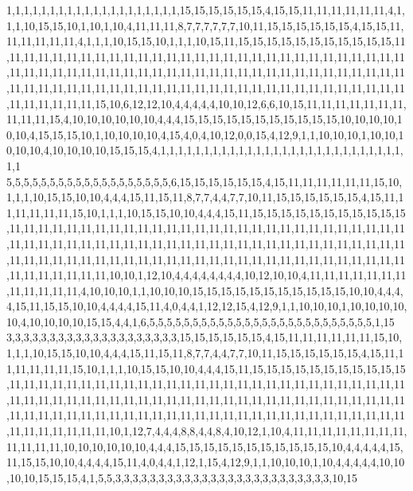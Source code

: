 1,1,1,1,1,1,1,1,1,1,1,1,1,1,1,1,1,1,1,1,15,15,15,15,15,15,4,15,15,11,11,11,11,11,11,4,1,1,1,10,15,15,10,1,10,1,10,4,11,11,11,8,7,7,7,7,7,7,10,11,15,15,15,15,15,15,4,15,15,11,11,11,11,11,11,4,1,1,1,10,15,15,10,1,1,1,10,15,11,15,15,15,15,15,15,15,15,15,15,15,11,11,11,11,11,11,11,11,11,11,11,11,11,11,11,11,11,11,11,11,11,11,11,11,11,11,11,11,11,11,11,11,11,11,11,11,11,11,11,11,11,11,11,11,11,11,11,11,11,11,11,11,11,11,11,11,11,11,11,11,11,11,11,11,11,11,11,11,11,11,11,11,11,11,11,11,11,11,11,11,11,11,11,11,11,11,11,11,11,11,11,15,10,6,12,12,10,4,4,4,4,4,10,10,12,6,6,10,15,11,11,11,11,11,11,11,11,11,11,15,4,10,10,10,10,10,10,4,4,4,15,15,15,15,15,15,15,15,15,15,15,10,10,10,10,10,10,4,15,15,15,10,1,10,10,10,10,4,15,4,0,4,10,12,0,0,15,4,12,9,1,1,10,10,10,1,10,10,10,10,10,4,10,10,10,10,15,15,15,4,1,1,1,1,1,1,1,1,1,1,1,1,1,1,1,1,1,1,1,1,1,1,1,1,1,1,1,1,1,1
5,5,5,5,5,5,5,5,5,5,5,5,5,5,5,5,5,5,5,6,15,15,15,15,15,15,4,15,11,11,11,11,11,11,15,10,1,1,1,10,15,15,10,10,4,4,4,15,11,15,11,8,7,7,4,4,7,7,10,11,15,15,15,15,15,15,4,15,11,11,11,11,11,11,15,10,1,1,1,10,15,15,10,10,4,4,4,15,11,15,15,15,15,15,15,15,15,15,15,15,11,11,11,11,11,11,11,11,11,11,11,11,11,11,11,11,11,11,11,11,11,11,11,11,11,11,11,11,11,11,11,11,11,11,11,11,11,11,11,11,11,11,11,11,11,11,11,11,11,11,11,11,11,11,11,11,11,11,11,11,11,11,11,11,11,11,11,11,11,11,11,11,11,11,11,11,11,11,11,11,11,11,11,11,11,11,11,11,11,11,11,10,10,1,12,10,4,4,4,4,4,4,4,4,10,12,10,10,4,11,11,11,11,11,11,11,11,11,11,11,11,4,10,10,10,1,1,10,10,10,15,15,15,15,15,15,15,15,15,15,15,10,10,4,4,4,4,15,11,15,15,10,10,4,4,4,4,15,11,4,0,4,4,1,12,12,15,4,12,9,1,1,10,10,10,1,10,10,10,10,10,4,10,10,10,10,15,15,4,4,1,6,5,5,5,5,5,5,5,5,5,5,5,5,5,5,5,5,5,5,5,5,5,5,5,5,5,5,1,15
3,3,3,3,3,3,3,3,3,3,3,3,3,3,3,3,3,3,3,3,15,15,15,15,15,15,4,15,11,11,11,11,11,11,15,10,1,1,1,10,15,15,10,10,4,4,4,15,11,15,11,8,7,7,4,4,7,7,10,11,15,15,15,15,15,15,4,15,11,11,11,11,11,11,15,10,1,1,1,10,15,15,10,10,4,4,4,15,11,15,15,15,15,15,15,15,15,15,15,15,11,11,11,11,11,11,11,11,11,11,11,11,11,11,11,11,11,11,11,11,11,11,11,11,11,11,11,11,11,11,11,11,11,11,11,11,11,11,11,11,11,11,11,11,11,11,11,11,11,11,11,11,11,11,11,11,11,11,11,11,11,11,11,11,11,11,11,11,11,11,11,11,11,11,11,11,11,11,11,11,11,11,11,11,11,11,11,11,11,11,11,10,1,12,7,4,4,4,8,8,4,4,8,4,10,12,1,10,4,11,11,11,11,11,11,11,11,11,11,11,11,10,10,10,10,10,10,4,4,4,15,15,15,15,15,15,15,15,15,15,15,10,4,4,4,4,4,15,11,15,15,10,10,4,4,4,4,15,11,4,0,4,4,1,12,1,15,4,12,9,1,1,10,10,10,1,10,4,4,4,4,4,10,10,10,10,15,15,15,4,1,5,5,3,3,3,3,3,3,3,3,3,3,3,3,3,3,3,3,3,3,3,3,3,3,3,3,3,10,15
